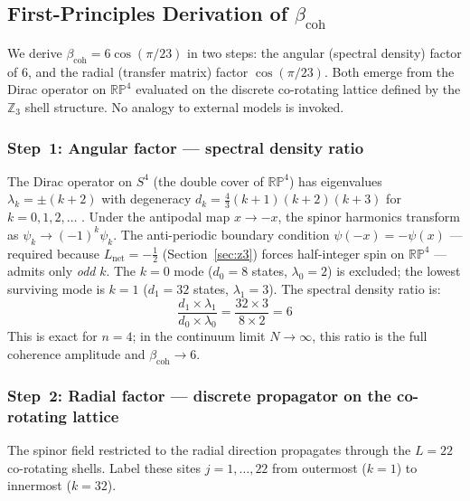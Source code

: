 \documentclass[12pt,a4paper]{article}
\begin{document}
\subsection{First-Principles Derivation of $\beta_\mathrm{coh}$}
\label{sec:bcoh_derivation}

We derive $\beta_\mathrm{coh} = 6\cos(\pi/23)$ in two steps: the angular
(spectral density) factor of 6, and the radial (transfer matrix) factor $\cos(\pi/23)$.
Both emerge from the Dirac operator on $\mathbb{RP}^4$ evaluated on the discrete
co-rotating lattice defined by the $\mathbb{Z}_3$ shell structure. No analogy
to external models is invoked.

\subsubsection*{Step~1: Angular factor --- spectral density ratio}

The Dirac operator on $S^4$ (the double cover of $\mathbb{RP}^4$) has eigenvalues
$\lambda_k = \pm(k + 2)$ with degeneracy $d_k = \tfrac{4}{3}(k+1)(k+2)(k+3)$
for $k = 0, 1, 2, \ldots$ \citep{Camporesi1994}. Under the antipodal map
$x \to -x$, the spinor harmonics transform as $\psi_k \to (-1)^k \psi_k$.
The anti-periodic boundary condition $\psi(-x) = -\psi(x)$ --- required because
$L_\mathrm{net} = -\tfrac{1}{2}$ (Section~\ref{sec:z3}) forces half-integer spin
on $\mathbb{RP}^4$ --- admits only \emph{odd} $k$. The $k=0$ mode ($d_0 = 8$
states, $\lambda_0 = 2$) is excluded; the lowest surviving mode is $k=1$
($d_1 = 32$ states, $\lambda_1 = 3$). The spectral density ratio is:
\begin{equation}
  \frac{d_1 \times \lambda_1}{d_0 \times \lambda_0}
  = \frac{32 \times 3}{8 \times 2} = 6
  \label{eq:spectral_ratio}
\end{equation}
This is exact for $n=4$; in the continuum limit $N\to\infty$, this ratio is the
full coherence amplitude and $\beta_\mathrm{coh} \to 6$.

\subsubsection*{Step~2: Radial factor --- discrete propagator on the co-rotating lattice}

The spinor field restricted to the radial direction propagates through the $L = 22$
co-rotating shells. Label these sites $j = 1,\ldots,22$ from outermost ($k=1$)
to innermost ($k=32$).
\end{document}
